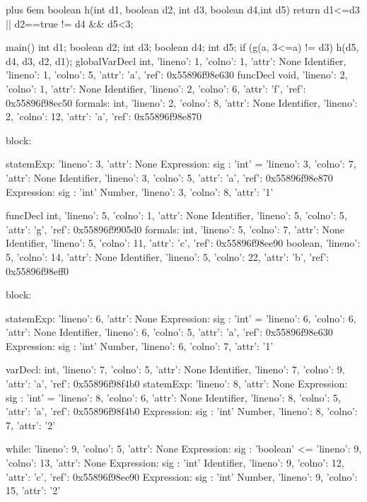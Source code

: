 \documentclass{article}
\makeatletter
\newenvironment{myverb}
 {\def\@xobeysp{\ }\verbatim\rightskip=0pt plus 6em\relax}
 {\endverbatim}
\makeatother
\begin{document}
\begin{itemize}
\begin{myverb}
boolean h(int d1, boolean d2, int d3, boolean d4,int d5){
    return d1<=d3 || d2==true != d4 && d5<3;
}

main(){
    int d1; boolean d2; int d3; boolean d4; int d5;
    if (g(a, 3<=a) != d3){
        h(d5, d4, d3, d2, d1);
    }
}
globalVarDecl
  int, {'lineno': 1, 'colno': 1, 'attr': None}
  Identifier, {'lineno': 1, 'colno': 5, 'attr': 'a', 'ref': 0x55896f98e630}
funcDecl
    void, {'lineno': 2, 'colno': 1, 'attr': None}
    Identifier, {'lineno': 2, 'colno': 6, 'attr': 'f', 'ref': 0x55896f98ec50}
      formals:
        int, {'lineno': 2, 'colno': 8, 'attr': None}
        Identifier, {'lineno': 2, 'colno': 12, 'attr': 'a', 'ref': 0x55896f98e870}

    block:

      statemExp: {'lineno': 3, 'attr': None}
        Expression: {sig : 'int'}
          = {'lineno': 3, 'colno': 7, 'attr': None}
            Identifier, {'lineno': 3, 'colno': 5, 'attr': 'a', 'ref': 0x55896f98e870}
            Expression: {sig : 'int'}
              Number, {'lineno': 3, 'colno': 8, 'attr': '1'}


funcDecl
    int, {'lineno': 5, 'colno': 1, 'attr': None}
    Identifier, {'lineno': 5, 'colno': 5, 'attr': 'g', 'ref': 0x55896f9905d0}
      formals:
        int, {'lineno': 5, 'colno': 7, 'attr': None}
        Identifier, {'lineno': 5, 'colno': 11, 'attr': 'c', 'ref': 0x55896f98ee90}
        boolean, {'lineno': 5, 'colno': 14, 'attr': None}
        Identifier, {'lineno': 5, 'colno': 22, 'attr': 'b', 'ref': 0x55896f98eff0}

    block:

      statemExp: {'lineno': 6, 'attr': None}
        Expression: {sig : 'int'}
          = {'lineno': 6, 'colno': 6, 'attr': None}
            Identifier, {'lineno': 6, 'colno': 5, 'attr': 'a', 'ref': 0x55896f98e630}
            Expression: {sig : 'int'}
              Number, {'lineno': 6, 'colno': 7, 'attr': '1'}


      varDecl:
        int, {'lineno': 7, 'colno': 5, 'attr': None}
        Identifier, {'lineno': 7, 'colno': 9, 'attr': 'a', 'ref': 0x55896f98f4b0}
      statemExp: {'lineno': 8, 'attr': None}
        Expression: {sig : 'int'}
          = {'lineno': 8, 'colno': 6, 'attr': None}
            Identifier, {'lineno': 8, 'colno': 5, 'attr': 'a', 'ref': 0x55896f98f4b0}
            Expression: {sig : 'int'}
              Number, {'lineno': 8, 'colno': 7, 'attr': '2'}


      while: {'lineno': 9, 'colno': 5, 'attr': None}
        Expression: {sig : 'boolean'}
          <= {'lineno': 9, 'colno': 13, 'attr': None}
            Expression: {sig : 'int'}
              Identifier, {'lineno': 9, 'colno': 12, 'attr': 'c', 'ref': 0x55896f98ee90}
            Expression: {sig : 'int'}
              Number, {'lineno': 9, 'colno': 15, 'attr': '2'}


\end{myverb}
\end{itemize}
\end{document}
